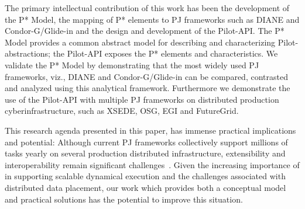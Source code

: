 \documentclass[conference]{IEEEtran}
\begin{document}

The primary intellectual contribution of this work has been the
development of the P* Model, the mapping of P* elements to PJ
frameworks such as DIANE and Condor-G/Glide-in and the design and
development of the Pilot-API.  The P* Model provides a common abstract
model for describing and characterizing Pilot-abstractions; the
Pilot-API exposes the P* elements and characteristics.  We validate
the P* Model by demonstrating that the most widely used PJ frameworks,
viz., DIANE and Condor-G/Glide-in can be compared, contrasted and
analyzed using this analytical framework.  Furthermore we demonstrate
the use of the Pilot-API with multiple PJ frameworks on distributed
production cyberinfrastructure, such as XSEDE, OSG, EGI and
FutureGrid.


This research agenda presented in this paper, has immense practical
implications and potential: Although current PJ frameworks
collectively support millions of tasks yearly on several production
distributed infrastructure, extensibility and interoperability remain
significant challenges~\cite{extenci}.  Given the increasing
importance of \pilotjobs in supporting scalable dynamical execution
and the challenges associated with distributed data placement, our
work which provides both a conceptual model and practical solutions
has the potential to improve this situation.
 




\end{document}
